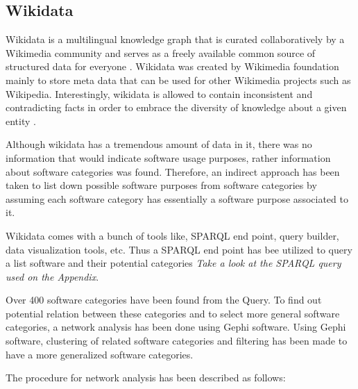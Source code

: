 \subsection{Wikidata   }
Wikidata is a multilingual knowledge graph that is curated collaboratively by a Wikimedia community and serves as a freely available common source of structured data for everyone \citep{enwiki:1060114687, enwiki:1060408581}. 
Wikidata was created by Wikimedia foundation mainly to store meta data that can be used for other Wikimedia projects such as Wikipedia. Interestingly, wikidata is allowed to contain inconsistent and contradicting facts in order to embrace the diversity of knowledge about a given entity \citep{vrandevcic2012wikidata}. 

Although wikidata has a tremendous amount of data in it, there was no information that would indicate software usage purposes, rather information about software categories was found. Therefore, an indirect approach has been taken to list down possible software purposes from software categories by assuming each software category has essentially a software purpose associated to it. 

Wikidata comes with a bunch of tools like, SPARQL end point, query builder, data visualization tools, etc. Thus a SPARQL end point has bee utilized  to query a list software and their potential categories \emph{Take a look at the SPARQL query used on the Appendix}. 

Over 400 software categories have been found from the Query. To find out potential relation between these categories and to select more general software categories, a network analysis has been done using Gephi software.  Using Gephi software, clustering of related software categories and filtering has been made to have a more generalized software categories.

The procedure for network analysis has been described as follows:

